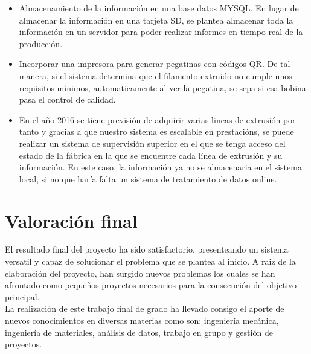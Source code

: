 \begin{itemize}
	\item{Almacenamiento de la información en una base datos MYSQL. En lugar de almacenar la información en una tarjeta SD, se plantea almacenar toda la información en un servidor para poder realizar informes en tiempo real de la producción.}
	\item{Incorporar una impresora para generar pegatinas con códigos QR. De tal manera, si el sistema determina que el filamento extruido no cumple unos requisitos mínimos, automaticamente al ver la pegatina, se sepa si esa bobina pasa el control de calidad.}
	\item{En el año 2016 se tiene previsión de adquirir varias lineas de extrusión por tanto y gracias a que nuestro sistema es escalable en prestacións, se puede realizar un sistema de supervisión superior en el que se tenga acceso del estado de la fábrica en la que se encuentre cada línea de extrusión y su información. En este caso, la información ya no se almacenaria en el sistema local, si no que haría falta un sistema de tratamiento de datos online.}

\end{itemize}

\section{Valoración final}

El resultado final del proyecto ha sido satisfactorio, presenteando un sistema versatil y capaz de solucionar el problema que se plantea al inicio. A raiz de la elaboración del proyecto, han surgido nuevos problemas los cuales se han afrontado como pequeños proyectos necesarios para la consecución del objetivo principal.\\

La realización de este trabajo final de grado ha llevado consigo el aporte de nuevos conocimientos en diversas materias como son: ingeniería mecánica, ingeniería de materiales, análisis de datos, trabajo en grupo y gestión de proyectos.